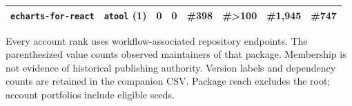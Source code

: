\begin{table}[t]
\begin{tabularx}{\linewidth}{@{}Ylrrrrrr@{}}
\texttt{echarts-for-react} & \texttt{atool} (1) & 0 & 0 & \#398 & \#>100 & \#1,945 & \#747\\
\bottomrule
\end{tabularx}
\par\smallskip\begin{minipage}{0.98\textwidth}\footnotesize Every account rank uses workflow-associated repository endpoints. The parenthesized value counts observed maintainers of that package. Membership is not evidence of historical publishing authority. Version labels and dependency counts are retained in the companion CSV. Package reach excludes the root; account portfolios include eligible seeds.\end{minipage}
\end{table}
